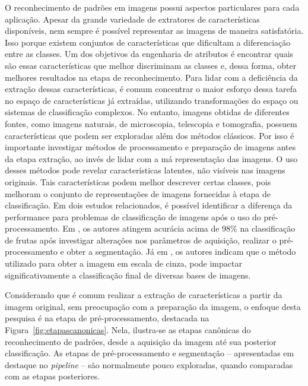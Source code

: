 O reconhecimento de padrões em imagens possui aspectos particulares para cada aplicação. Apesar da grande variedade de extratores de características disponíveis, nem sempre é possível representar as imagens de maneira satisfatória. Isso porque existem conjuntos de características que dificultam a diferenciação entre as classes. Um dos objetivos da engenharia de atributos é encontrar quais são essas características que melhor discriminam as classes e, dessa forma, obter melhores resultados na etapa de reconhecimento. Para lidar com a deficiência da extração dessas características, é comum concentrar o maior esforço dessa tarefa no espaço de características já extraídas, utilizando transformações do espaço ou sistemas de classificação complexos. No entanto, imagens obtidas de diferentes fontes, como imagens naturais, de microscopia, telescopia e tomografia, possuem características que podem ser exploradas além dos métodos clássicos. Por isso é importante investigar métodos de processamento e preparação de imagens antes da etapa extração, ao invés de lidar com a má representação das imagens. O uso desses métodos pode revelar características latentes, não visíveis nas imagens originais. Tais características podem melhor descrever certas classes, pois melhoram o conjunto de representações de imagens fornecidas à etapa de classificação. Em dois estudos relacionados, é possível identificar a diferença da performance para problemas de classificação de imagens após o uso do pré-processamento. Em , os autores atingem acurácia acima de 98\% na classificação de frutas após investigar alterações nos parâmetros de aquisição, realizar o pré-processamento e obter a segmentação. Já em , os autores indicam que o método utilizado para obter a imagem em escala de cinza, pode impactar significativamente a classificação final de diversas bases de imagens.

Considerando que é comum realizar a extração de características a partir da imagem original, sem preocupação com a preparação da imagem, o enfoque desta pesquisa é na etapa de pré-processamento, destacada na Figura~\ref{fig:etapascanonicas}. Nela, ilustra-se as etapas canônicas do reconhecimento de padrões, desde a aquisição da imagem até sua posterior classificação. As etapas de pré-processamento e segmentação -- apresentadas em destaque no \textit{pipeline} -- são normalmente pouco exploradas, quando comparadas com as etapas posteriores.

